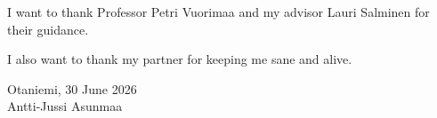 I want to thank Professor Petri Vuorimaa and my advisor Lauri Salminen
for their guidance.

I also want to thank my partner for keeping me sane and alive.

\vspace{5cm}
Otaniemi, 30 June 2026\\

\vspace{5mm}
{\hfill Antti-Jussi Asunmaa \hspace{1cm}}

\newpage